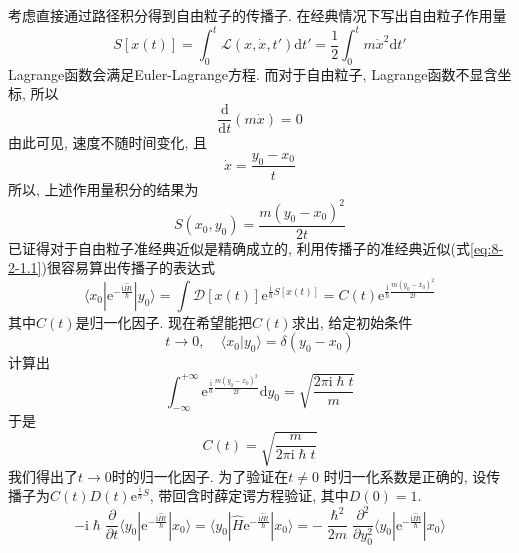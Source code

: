         考虑直接通过路径积分得到自由粒子的传播子. 在经典情况下写出自由粒子作用量
        \begin{equation}
            S[x(t)] = \int_0^t \mathcal{L}(x,\dot{x},t') \mathrm{d}t' = \frac 12 \int_0^t m\dot{x}^2 \mathrm{d}t'
        \end{equation}
        Lagrange函数会满足Euler-Lagrange方程. 而对于自由粒子, Lagrange函数不显含坐标, 所以
        \begin{equation}
            \frac {\mathrm{d}}{\mathrm{d}t} (m \dot x) = 0
        \end{equation}
        由此可见, 速度不随时间变化, 且
        \begin{equation}
            \dot{x} = \frac{y_0 - x_0}t
        \end{equation}
        所以, 上述作用量积分的结果为
        \begin{equation}
            S(x_0, y_0) = \frac{m(y_0 - x_0)^2}{2t}
        \end{equation}
        已证得对于自由粒子准经典近似是精确成立的, 利用传播子的准经典近似(式\ref{eq:8-2-1.1})很容易算出传播子的表达式
        \begin{equation}
            \langle x_0 | \mathrm{e}^{-\frac {\mathrm{i}\hat{H}t}{\hslash}} | y_0 \rangle 
            = \int \mathcal{D}[x(t)] \mathrm{e}^{ \frac{\mathrm{i}}{\hslash} S[x(t)] } = C(t) \mathrm{e}^{\frac {\mathrm{i}}{\hslash} \frac{m(y_0 - x_0)^2}{2t}}
        \end{equation}
        其中$C(t)$是归一化因子. 现在希望能把$C(t)$求出, 给定初始条件
        \begin{equation}
            t \to 0,~~~~~\langle x_0|y_0\rangle = \delta(y_0-x_0)
        \end{equation}
        计算出
        \begin{equation}
            \int_{-\infty}^{+\infty} \mathrm{e}^{\frac {\mathrm{i}}{\hslash} \frac {m(y_0 - x_0)^2}{2t}}\mathrm{d}y_0 = \sqrt{\frac {2\pi\mathrm{i}\hslash t}m}
        \end{equation}
        于是
        \begin{equation}\label{eq:8-2-3}
            C(t) = \sqrt{\frac m{2\pi\mathrm{i}\hslash t}}
        \end{equation}
        我们得出了$t \to 0$时的归一化因子. 为了验证在$t \neq 0$ 时归一化系数是正确的, 设传播子为$C(t) D(t) \mathrm{e}^{\frac{\mathrm{i}}{\hslash}S}$, 带回含时薛定谔方程验证, 其中$D(0) = 1$.
        \begin{equation}
            -\mathrm{i}\hslash \frac {\partial}{\partial t} \langle y_0 | \mathrm{e}^{-\frac {\mathrm{i}\hat{H}t}{\hslash}} |x_0 \rangle 
            =  \langle y_0 | \hat{H} \mathrm{e}^{-\frac {\mathrm{i}\hat{H}t}{\hslash}} |x_0 \rangle 
            = -\frac {\hslash^2}{2m} \frac {\partial^2}{\partial y_0^2} \langle y_0 | \mathrm{e}^{-\frac {\mathrm{i}\hat{H}t}{\hslash}} |x_0 \rangle
        \end{equation}
